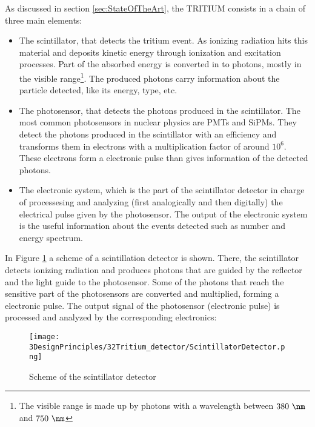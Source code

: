 As discussed in section \ref{sec:StateOfTheArt}, the TRITIUM consists in a chain of three main elements:

\begin{itemize}

\item{} The scintillator, that detects the tritium event. As ionizing radiation hits this material and deposits kinetic energy through ionization and excitation processes. Part of the absorbed energy is converted in to photons, mostly in the visible range\footnote{The visible range is made up by photons with a wavelength between $380~\nm$ and $750~\nm$}. The produced photons carry information about the particle detected, like its energy, type, etc.

\item{} The photosensor, that detects the photons produced in the scintillator. The most common photosensors in nuclear physics are PMTs and SiPMs. They detect the photons produced in the scintillator with an efficiency and transforms them in electrons with a multiplication factor of around $10^6$. These electrons form a electronic pulse than gives information of the detected photons.

\item{} The electronic system, which is the part of the scintillator detector in charge of processesing and analyzing (first analogically and then digitally) the electrical pulse given by the photosensor. The output of the electronic system is the useful information about the events detected such as number and energy spectrum.

\end{itemize}

In Figure \ref{fig:ScintillatorDetector} a scheme of a scintillation detector is shown. There, the scintillator detects ionizing radiation and produces photons that are guided by the reflector and the light guide to the photosensor. Some of the photons that reach the sensitive part of the photosensors are converted and multiplied, forming a electronic pulse. The output signal of the photosensor (electronic pulse) is processed and analyzed by the corresponding electronics:

\begin{figure}[hbtp]
\texttt{[image: 3DesignPrinciples/32Tritium\_detector/ScintillatorDetector.png]}
\centering
\caption{Scheme of the scintillator detector\label{fig:ScintillatorDetector}}
\end{figure}
